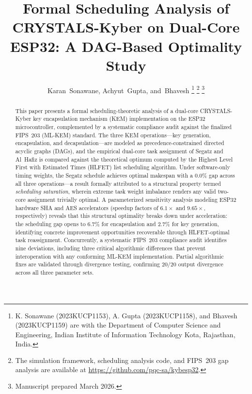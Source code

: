 \documentclass[journal]{IEEEtran}
\begin{document}
\title{Formal Scheduling Analysis of CRYSTALS-Kyber on Dual-Core ESP32: A DAG-Based Optimality Study}

\author{Karan~Sonawane,
        Achyut~Gupta,
        and~Bhavesh%
\thanks{K. Sonawane (2023KUCP1153), A. Gupta (2023KUCP1158), and Bhavesh (2023KUCP1159) are with the Department of Computer Science and Engineering, Indian Institute of Information Technology Kota, Rajasthan, India.}%
\thanks{The simulation framework, scheduling analysis code, and FIPS~203 gap analysis are available at \url{https://github.com/pqc-sa/kybesp32}.}%
\thanks{Manuscript prepared March 2026.}}


\maketitle

\begin{abstract}
This paper presents a formal scheduling-theoretic analysis of a dual-core CRYSTALS-Kyber key encapsulation mechanism (KEM) implementation on the ESP32 microcontroller, complemented by a systematic compliance audit against the finalized FIPS~203 (ML-KEM) standard. The three KEM operations---key generation, encapsulation, and decapsulation---are modeled as precedence-constrained directed acyclic graphs (DAGs), and the empirical dual-core task assignment of Segatz and Al~Hafiz is compared against the theoretical optimum computed by the Highest Level First with Estimated Times (HLFET) list scheduling algorithm. Under software-only timing weights, the Segatz schedule achieves optimal makespan with a 0.0\% gap across all three operations---a result formally attributed to a structural property termed \emph{scheduling saturation}, wherein extreme task weight imbalance renders any valid two-core assignment trivially optimal. A parameterized sensitivity analysis modeling ESP32 hardware SHA and AES accelerators (speedup factors of $6.1\times$ and $9.65\times$, respectively) reveals that this structural optimality breaks down under acceleration: the scheduling gap opens to 6.7\% for encapsulation and 2.7\% for key generation, identifying concrete improvement opportunities recoverable through HLFET-optimal task reassignment. Concurrently, a systematic FIPS~203 compliance audit identifies nine deviations, including three critical algorithmic differences that prevent interoperation with any conforming ML-KEM implementation. Partial algorithmic fixes are validated through divergence testing, confirming 20/20 output divergence across all three parameter sets.
\end{abstract}
\end{document}
